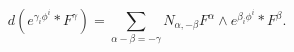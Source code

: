 \begin{equation}
d(e^{\gamma _{i}\phi ^{i}}\ast F^{\gamma })=\sum\limits_{\alpha
-\beta =-\gamma }N_{\alpha ,-\beta }F^{\alpha }\wedge e^{\beta
_{i}\phi ^{i}}\ast F^{\beta }.
\end{equation}

